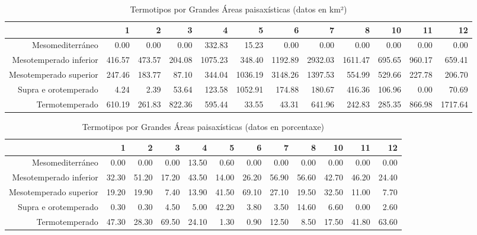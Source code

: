 \begin{table}[p]
\centering
\caption{Termotipos por Grandes Áreas paisaxísticas (datos en km²)} 
\label{xtaboa3}
\begin{tabular}{rrrrrrrrrrrr}
  \hline
 & 1 & 2 & 3 & 4 & 5 & 6 & 7 & 8 & 10 & 11 & 12 \\ 
  \hline
Mesomediterráneo & 0.00 & 0.00 & 0.00 & 332.83 & 15.23 & 0.00 & 0.00 & 0.00 & 0.00 & 0.00 & 0.00 \\ 
  Mesotemperado inferior & 416.57 & 473.57 & 204.08 & 1075.23 & 348.40 & 1192.89 & 2932.03 & 1611.47 & 695.65 & 960.17 & 659.41 \\ 
  Mesotemperado superior & 247.46 & 183.77 & 87.10 & 344.04 & 1036.19 & 3148.26 & 1397.53 & 554.99 & 529.66 & 227.78 & 206.70 \\ 
  Supra e orotemperado & 4.24 & 2.39 & 53.64 & 123.58 & 1052.91 & 174.88 & 180.67 & 416.36 & 106.96 & 0.00 & 70.69 \\ 
  Termotemperado & 610.19 & 261.83 & 822.36 & 595.44 & 33.55 & 43.31 & 641.96 & 242.83 & 285.35 & 866.98 & 1717.64 \\ 
   \hline
\end{tabular}
\end{table}
\begin{table}[p]
\centering
\caption{Termotipos por Grandes Áreas paisaxísticas (datos en porcentaxe)} 
\label{xtaboa3p}
\begin{tabular}{rrrrrrrrrrrr}
  \hline
 & 1 & 2 & 3 & 4 & 5 & 6 & 7 & 8 & 10 & 11 & 12 \\ 
  \hline
Mesomediterráneo & 0.00 & 0.00 & 0.00 & 13.50 & 0.60 & 0.00 & 0.00 & 0.00 & 0.00 & 0.00 & 0.00 \\ 
  Mesotemperado inferior & 32.30 & 51.20 & 17.20 & 43.50 & 14.00 & 26.20 & 56.90 & 56.60 & 42.70 & 46.20 & 24.40 \\ 
  Mesotemperado superior & 19.20 & 19.90 & 7.40 & 13.90 & 41.50 & 69.10 & 27.10 & 19.50 & 32.50 & 11.00 & 7.70 \\ 
  Supra e orotemperado & 0.30 & 0.30 & 4.50 & 5.00 & 42.20 & 3.80 & 3.50 & 14.60 & 6.60 & 0.00 & 2.60 \\ 
  Termotemperado & 47.30 & 28.30 & 69.50 & 24.10 & 1.30 & 0.90 & 12.50 & 8.50 & 17.50 & 41.80 & 63.60 \\ 
   \hline
\end{tabular}
\end{table}
